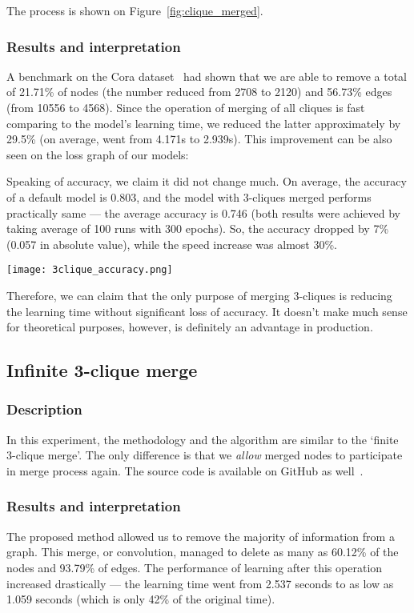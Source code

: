 The process is shown on Figure~\ref{fig:clique_merged}.

\subsubsection*{Results and interpretation}

A benchmark on the Cora dataset~\cite{cora_dataset} had shown that we are able to remove a total of 21.71\% of nodes (the number reduced from 2708 to 2120) and 56.73\% edges (from 10556 to 4568).
Since the operation of merging of all cliques is fast comparing to the model's learning time, we reduced the latter approximately by 29.5\% (on average, went from 4.171s to 2.939s).
This improvement can be also seen on the loss graph of our models:

Speaking of accuracy, we claim it did not change much.
On average, the accuracy of a default model is 0.803, and the model with 3-cliques merged performs practically same --- the average accuracy is 0.746 (both results were achieved by taking average of 100 runs with 300 epochs).
So, the accuracy dropped by 7\% (0.057 in absolute value), while the speed increase was almost 30\%.

\begin{center}
	\texttt{[image: 3clique\_accuracy.png]}
\end{center}

Therefore, we can claim that the only purpose of merging 3-cliques is reducing the learning time without significant loss of accuracy.
It doesn't make much sense for theoretical purposes, however, is definitely an advantage in production.

\subsection{Infinite 3-clique merge}
\subsubsection*{Description}
In this experiment, the methodology and the algorithm are similar to the `finite 3-clique merge'.
The only difference is that we \emph{allow} merged nodes to participate in merge process again.
The source code is available on GitHub as well~\cite{3clique_inf_merge_experiment}.

\subsubsection*{Results and interpretation}
The proposed method allowed us to remove the majority of information from a graph.
This merge, or convolution, managed to delete as many as 60.12\% of the nodes and 93.79\% of edges.
The performance of learning after this operation increased drastically --- the learning time went from 2.537 seconds to as low as 1.059 seconds (which is only 42\% of the original time).

